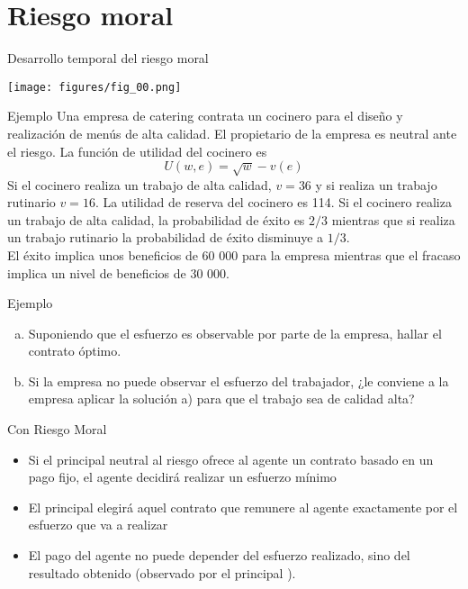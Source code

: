 \section{Riesgo moral}

\begin{frame}{Desarrollo temporal del riesgo moral}
	\begin{center}
		\texttt{[image: figures/fig\_00.png]}
	\end{center}
\end{frame}
\begin{frame}{Ejemplo}
	Una empresa de catering contrata un cocinero para el diseño y realización de menús de alta calidad. El propietario de la empresa es neutral ante el riesgo. La función de utilidad del cocinero es
		$$U(w, e) = \sqrt{w} -v(e)$$
	Si el cocinero realiza un trabajo de alta calidad, $v=36$ y si realiza un trabajo rutinario $v=16$. La utilidad de reserva del cocinero es 114. Si el cocinero realiza un trabajo de alta calidad, la probabilidad de éxito es $2/3$ mientras que si realiza un trabajo rutinario la probabilidad de éxito disminuye a $1/3$.\\
	
	El éxito implica unos beneficios de 60 000 para la empresa mientras que el fracaso implica un nivel de beneficios de 30 000.
\end{frame}
\begin{frame}{Ejemplo}
	\begin{enumerate}[a)]
		\item Suponiendo que el esfuerzo es observable por parte de la empresa, hallar el contrato óptimo.
		\item Si la empresa no puede observar el esfuerzo del trabajador, ¿le conviene a la empresa aplicar la solución a) para que el trabajo sea de calidad alta?
	\end{enumerate}
\end{frame}
\begin{frame}{Con Riesgo Moral}
		\begin{itemize}
			\item Si el principal neutral al riesgo ofrece al agente un contrato basado en un pago fijo, el agente decidirá realizar un esfuerzo mínimo
			\item El principal elegirá aquel contrato que remunere al agente exactamente por el esfuerzo que va a realizar
			\item El pago del agente no puede depender del esfuerzo realizado, sino del resultado obtenido (observado por el principal ).
		\end{itemize}
\end{frame}
